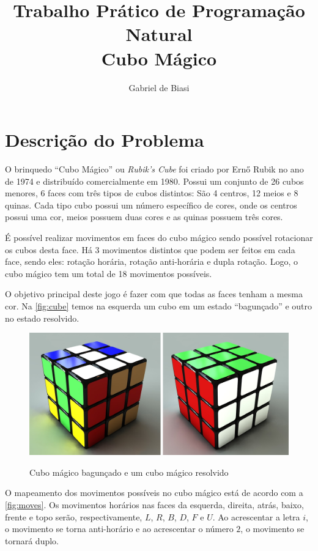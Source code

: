 \documentclass[12pt]{article}
\title{Trabalho Prático de Programação Natural\\Cubo Mágico}
\author{Gabriel de Biasi\inst{1}}
\begin{document}
\maketitle

\section{Descrição do Problema}
  O brinquedo ``Cubo Mágico'' ou \textit{Rubik's Cube} foi criado por Ernő Rubik no ano de  1974 e distribuído comercialmente em 1980. Possui um conjunto de 26 cubos menores, 6 faces com três tipos de cubos distintos: São 4 centros, 12 meios e 8 quinas. Cada tipo cubo possui um número específico de cores, onde os centros possui uma cor, meios possuem duas cores e as quinas possuem três cores.

  É possível realizar movimentos em faces do cubo mágico sendo possível rotacionar os cubos desta face. Há 3 movimentos distintos que podem ser feitos em cada face, sendo eles: rotação horária, rotação anti-horária e dupla rotação. Logo, o cubo mágico tem um total de 18 movimentos possíveis.

  O objetivo principal deste jogo é fazer com que todas as faces tenham a mesma cor. Na \autoref{fig:cube} temos na esquerda um cubo em um estado ``bagunçado'' e outro no estado resolvido.

  \begin{figure}[!ht]
    \centering
    \caption{Cubo mágico bagunçado e um cubo mágico resolvido}
    \includegraphics[scale=0.3]{images/cube.png}
    \label{fig:cube}
  \end{figure}

  O mapeamento dos movimentos possíveis no cubo mágico está de acordo com a \autoref{fig:moves}. Os movimentos horários nas faces da esquerda, direita, atrás, baixo, frente e topo serão, respectivamente, $L$, $R$, $B$, $D$, $F$ e $U$. Ao acrescentar a letra $i$, o movimento se torna anti-horário e ao acrescentar o número $2$, o movimento se tornará duplo.
\end{document}
